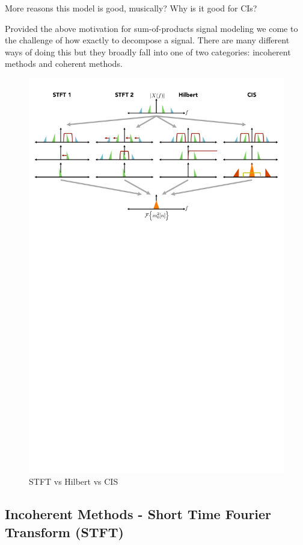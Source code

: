\documentclass [11pt, proquest] {uwthesis}[2015/03/03]
\begin{document}
More reasons this model is good, musically?
Why is it good for CIs?

Provided the above motivation for sum-of-products signal modeling we come to the challenge of how exactly to decompose a signal.  There are many different ways of doing this but they broadly fall into one of two categories: incoherent methods and coherent methods.

\begin{figure}[!ht]
  \centering
    \includegraphics[width=1.0\textwidth]{STFTvsHILBERTvsCIS}   
    \caption{STFT vs Hilbert vs CIS}
\end{figure}

\subsection{Incoherent Methods - Short Time Fourier Transform (STFT)}
\end{document}
